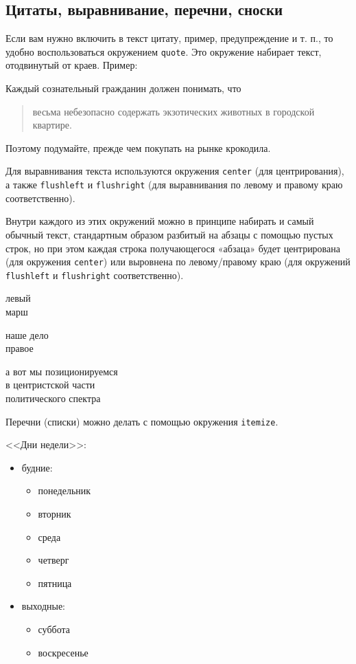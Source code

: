 \documentclass[a4paper,11pt]{article} %
\begin{document}
\subsection{Цитаты, выравнивание, перечни, сноски}

Если вам нужно включить в текст цитату, пример, предупреждение
и т. п., то удобно воспользоваться окружением {\tt quote}. Это окружение
набирает текст, отодвинутый от краев. Пример:

Каждый сознательный гражданин должен понимать, что
\begin{quote}
	весьма небезопасно содержать экзотических животных в городской квартире.
\end{quote}
Поэтому подумайте, прежде чем покупать на рынке крокодила.

Для выравнивания текста используются окружения {\tt center} (для центрирования), а также {\tt flushleft} и {\tt flushright} (для выравнивания по левому и правому краю соответственно).

Внутри каждого из этих окружений можно в принципе набирать и самый обычный текст, стандартным образом разбитый на абзацы с помощью пустых строк, но при этом каждая строка получающегося «абзаца» будет центрирована (для окружения {\tt center}) или выровнена по левому/правому краю (для окружений {\tt flushleft} и {\tt flushright} соответственно).

\begin{flushleft}
	левый\\
	марш
\end{flushleft}

\begin{flushright}
	наше дело\\
	правое
\end{flushright}

\begin{center}
	а вот мы позиционируемся\\
	в центристской части\\
	политического спектра
\end{center}

Перечни (списки) можно делать с помощью окружения {\tt itemize}.

<<Дни недели>>:
\begin{itemize}
	\item
	будние:
	\begin{itemize}
		\item
		понедельник
		
		\item 
		вторник
		
		\item среда
		
		\item четверг
		\item пятница
	\end{itemize}
	
	\item выходные:
	\begin{itemize}
		\item суббота
		\item воскресенье
	\end{itemize}
\end{itemize}
\end{document}
